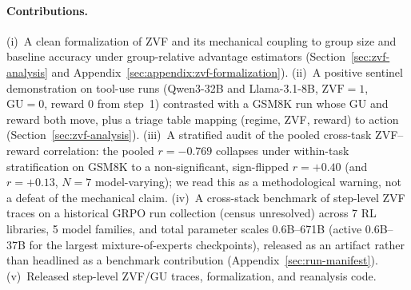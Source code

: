 \paragraph{Contributions.}
(i)~A clean formalization of ZVF and its mechanical coupling to group size
and baseline accuracy under group-relative advantage estimators
(Section~\ref{sec:zvf-analysis} and Appendix~\ref{sec:appendix:zvf-formalization}).
(ii)~A positive sentinel demonstration on tool-use runs (Qwen3-32B and
Llama-3.1-8B, $\mathrm{ZVF}{=}1$, $\mathrm{GU}{=}0$, reward $0$ from step~1)
contrasted with a GSM8K run whose GU and reward both move, plus a triage
table mapping (regime, ZVF, reward) to action
(Section~\ref{sec:zvf-analysis}).
(iii)~A stratified audit of the pooled cross-task ZVF--reward correlation:
the pooled $r{=}-0.769$ collapses under within-task stratification on
GSM8K to a non-significant, sign-flipped $r{=}+0.40$ (and $r{=}+0.13$,
$N{=}7$ model-varying); we read this as a methodological warning, not a
defeat of the mechanical claim.
(iv)~A cross-stack benchmark of step-level ZVF traces on a historical GRPO run collection (census unresolved) across
7 RL libraries, 5 model families, and total parameter scales 0.6B--671B
(active 0.6B--37B for the largest mixture-of-experts checkpoints), released
as an artifact rather than headlined as a benchmark contribution
(Appendix~\ref{sec:run-manifest}).
(v)~Released step-level ZVF/GU traces, formalization, and reanalysis code.
